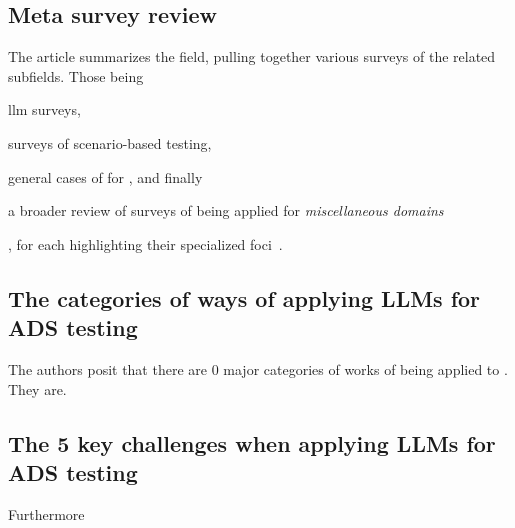 \subsection{Meta survey review}

The article summarizes the field, pulling together various surveys of the
related subfields. Those being \begin{inparaenum}
    \item \acrshort{llm} surveys,
    \item surveys of scenario-based testing,
    \item general cases of  for , and finally
    \item a broader review of surveys of  being applied for
    \textit{miscellaneous domains}
\end{inparaenum},
for each highlighting their specialized
foci~\cite[2]{surveyLLMScenarioBasedTesting}.

\subsection{The categories of ways of applying LLMs for ADS testing}

The authors posit that there are \num{0} major categories of works of
 being applied to . They are.

\subsection{The \num{5} key challenges when applying LLMs for ADS testing}

Furthermore
